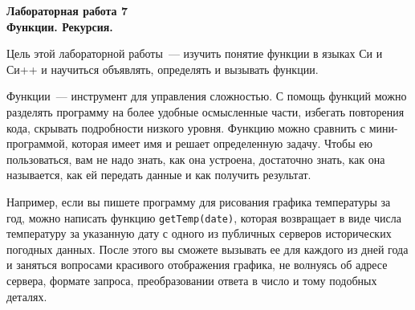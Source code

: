 \documentclass{article}
\begin{document}
\noindent
\textbf{Лабораторная работа 7}\\
{\Large \textbf{Функции. Рекурсия.}}\\
\strut\hfill{}

Цель этой лабораторной работы~--- изучить понятие функции в языках Си и Си++ и научиться объявлять, определять и вызывать функции.

Функции~--- инструмент для управления сложностью. С помощь функций можно разделять программу на более удобные осмысленные части, избегать повторения кода, скрывать подробности низкого уровня. Функцию можно сравнить с мини-программой, которая имеет имя и решает определенную задачу. Чтобы ею пользоваться, вам не надо знать, как она устроена, достаточно знать, как она называется, как ей передать данные и как получить результат.

Например, если вы пишете программу для рисования графика температуры за год, можно написать функцию \texttt{getTemp(date)}, которая возвращает в виде числа температуру за указанную дату с одного из публичных серверов исторических погодных данных. После этого вы сможете вызывать ее для каждого из дней года и заняться вопросами красивого отображения графика, не волнуясь об адресе сервера, формате запроса, преобразовании ответа в число и тому подобных деталях.
\end{document}
